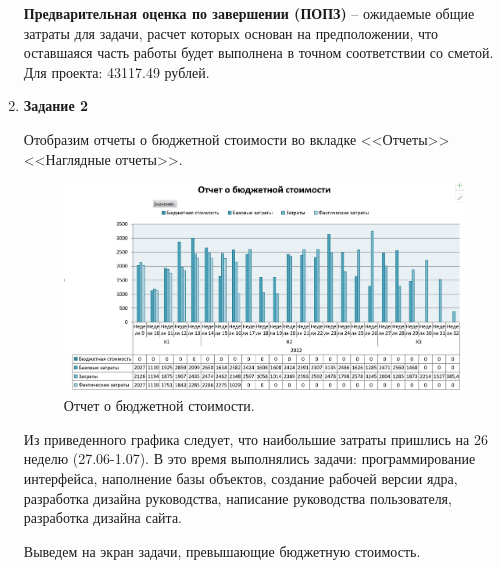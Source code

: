\documentclass[a4paper,14pt]{extreport} %
\begin{document}
\begin{enumerate}
\textbf{Предварительная оценка по завершении (ПОПЗ)} -- ожидаемые общие затраты для задачи, расчет которых основан на предположении, что оставшаяся часть работы будет выполнена в точном соответствии со сметой. Для проекта: 43117.49 рублей.

\item \textbf{Задание 2}

Отобразим отчеты о бюджетной стоимости во вкладке <<Отчеты>> <<Наглядные отчеты>>.

\begin{figure}[H]
  \centering
  \caption{Отчет о бюджетной стоимости. }
  \includegraphics[scale=0.55]{22}
\end{figure}

Из приведенного графика следует, что наибольшие затраты пришлись на 26 неделю (27.06-1.07). 
В это время выполнялись задачи: программирование интерфейса, наполнение базы объектов, создание рабочей версии ядра, разработка дизайна руководства, написание руководства пользователя, разработка дизайна сайта.

Выведем на экран задачи, превышающие бюджетную стоимость.


\end{enumerate}
\end{document}
